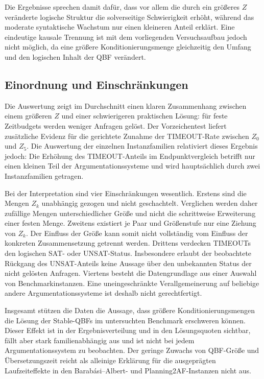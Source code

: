 Die Ergebnisse sprechen damit dafür, dass vor allem die durch ein größeres
\(Z\) veränderte logische Struktur die solverseitige Schwierigkeit erhöht,
während das moderate syntaktische Wachstum nur einen kleineren Anteil
erklärt. Eine eindeutige kausale Trennung ist mit dem vorliegenden
Versuchsaufbau jedoch nicht möglich, da eine größere Konditionierungsmenge 
gleichzeitig den Umfang und den logischen Inhalt der QBF verändert. 

\subsection{Einordnung und Einschränkungen}
\label{subsec:empirical-stable-z-limitations}

Die Auswertung zeigt im Durchschnitt einen klaren Zusammenhang zwischen einem
größeren \(Z\) und einer schwierigeren praktischen Lösung: für feste Zeitbudgets 
werden weniger Anfragen gelöst. Der
Vorzeichentest liefert zusätzliche Evidenz für die gerichtete Zunahme der
TIMEOUT-Rate zwischen \(Z_0\) und \(Z_5\). Die Auswertung der einzelnen Instanzfamilien
relativiert dieses Ergebnis jedoch: Die Erhöhung des TIMEOUT-Anteils im
Endpunktvergleich betrifft nur einen kleinen Teil der
Argumentationssysteme und wird hauptsächlich durch zwei Instanzfamilien
getragen.

Bei der Interpretation sind vier Einschränkungen wesentlich. Erstens sind
die Mengen \(Z_k\) unabhängig gezogen und nicht geschachtelt. Verglichen
werden daher zufällige Mengen unterschiedlicher Größe und nicht die
schrittweise Erweiterung einer festen Menge. Zweitens existiert je Paar
und Größenstufe nur eine Ziehung von \(Z_k\). Der Einfluss der Größe kann
somit nicht vollständig vom Einfluss der konkreten Zusammensetzung
getrennt werden. Drittens verdecken TIMEOUTs den logischen SAT- oder
UNSAT-Status. Insbesondere erlaubt der beobachtete Rückgang des
UNSAT-Anteils keine Aussage über den unbekannten Status der nicht gelösten
Anfragen. Viertens besteht die Datengrundlage aus einer Auswahl von
Benchmarkinstanzen. Eine uneingeschränkte Verallgemeinerung auf beliebige
andere Argumentationssysteme ist deshalb nicht gerechtfertigt.

Insgesamt stützen die Daten die Aussage, dass größere
Konditionierungsmengen die Lösung der Stable-QBFs im untersuchten
Benchmark erschweren können. Dieser Effekt ist in der Ergebnisverteilung
und in den Lösungsquoten sichtbar, fällt aber stark
familienabhängig aus und ist nicht bei jedem Argumentationssystem zu
beobachten. Der geringe Zuwachs von QBF-Größe und Übersetzungszeit reicht
als alleinige Erklärung für die ausgeprägten Laufzeiteffekte in den
Barabási--Albert- und Planning2AF-Instanzen nicht aus.
